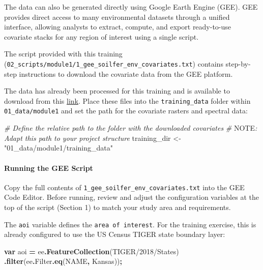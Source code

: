\documentclass[
  10pt,
  b5paper,
  oneside]{book}
\newenvironment{Shaded}{\begin{snugshade}}{\end{snugshade}}
\newcommand{\AlertTok}[1]{\textcolor[rgb]{0.94,0.16,0.16}{#1}}
\newcommand{\AttributeTok}[1]{\textcolor[rgb]{0.13,0.29,0.53}{#1}}
\newcommand{\CommentTok}[1]{\textcolor[rgb]{0.56,0.35,0.01}{\textit{#1}}}
\newcommand{\FunctionTok}[1]{\textcolor[rgb]{0.13,0.29,0.53}{\textbf{#1}}}
\newcommand{\KeywordTok}[1]{\textcolor[rgb]{0.13,0.29,0.53}{\textbf{#1}}}
\newcommand{\NormalTok}[1]{#1}
\newcommand{\OperatorTok}[1]{\textcolor[rgb]{0.81,0.36,0.00}{\textbf{#1}}}
\newcommand{\OtherTok}[1]{\textcolor[rgb]{0.56,0.35,0.01}{#1}}
\newcommand{\StringTok}[1]{\textcolor[rgb]{0.31,0.60,0.02}{#1}}
\begin{document}
The data can also be generated directly using Google Earth Engine (GEE). GEE provides direct access to many environmental datasets through a unified interface, allowing analysts to extract, compute, and export ready-to-use covariate stacks for any region of interest using a single script.

The script provided with this training (\texttt{02\_scripts/module1/1\_gee\_soilfer\_env\_covariates.txt}) contains step-by-step instructions to download the covariate data from the GEE platform.

The data has already been processed for this training and is available to download from this \href{https://drive.google.com/drive/folders/1EGrkhbMTi2qglemuD_onegAqLWZb3BbT}{link}. Place these files into the \texttt{training\_data} folder within \texttt{01\_data/module1} and set the path for the covariate rasters and spectral data:

\begin{Shaded}
\begin{Highlighting}[]
\CommentTok{\# Define the relative path to the folder with the downloaded covariates}
\CommentTok{\# }\AlertTok{NOTE}\CommentTok{: Adapt this path to your project structure}
\NormalTok{  training\_dir }\OtherTok{\textless{}{-}}\StringTok{"01\_data/module1/training\_data"}
\end{Highlighting}
\end{Shaded}

\paragraph*{Running the GEE Script}\label{running-the-gee-script}

Copy the full contents of \texttt{1\_gee\_soilfer\_env\_covariates.txt} into the GEE Code Editor. Before running, review and adjust the configuration variables at the top of the script (Section 1) to match your study area and requirements.

The \texttt{aoi} variable defines the \texttt{area\ of\ interest}. For the training exercise, this is already configured to use the US Census TIGER state boundary layer:

\begin{Shaded}
\begin{Highlighting}[]
\KeywordTok{var}\NormalTok{ aoi }\OperatorTok{=}\NormalTok{ ee}\OperatorTok{.}\FunctionTok{FeatureCollection}\NormalTok{(}\StringTok{\textquotesingle{}TIGER/2018/States\textquotesingle{}}\NormalTok{)}
  \OperatorTok{.}\FunctionTok{filter}\NormalTok{(ee}\OperatorTok{.}\AttributeTok{Filter}\OperatorTok{.}\FunctionTok{eq}\NormalTok{(}\StringTok{\textquotesingle{}NAME\textquotesingle{}}\OperatorTok{,} \StringTok{\textquotesingle{}Kansas\textquotesingle{}}\NormalTok{))}\OperatorTok{;}
\end{Highlighting}
\end{Shaded}
\end{document}
